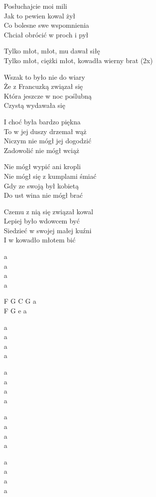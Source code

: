 \begin{text}
    Posłuchajcie moi mili\\
    Jak to pewien kowal żył\\
    Co bolesne swe wspomnienia\\
    Chciał obrócić w proch i pył

    \vin Tylko młot, młot, mu dawał siłę\\
    \vin Tylko młot, ciężki młot, kowadła wierny brat (2x)

    Wszak to było nie do wiary\\
    Że z Francuzką związał się\\
    Która jeszcze w noc poślubną\\
    Czystą wydawała się

    I choć była bardzo piękna\\
    To w jej duszy drzemał wąż\\
    Niczym nie mógł jej dogodzić\\
    Zadowolić nie mógł wciąż

    Nie mógł wypić ani kropli\\
    Nie mógł się z kumplami śmiać\\
    Gdy ze swoją był kobietą\\
    Do ust wina nie mógł brać

    Czemu z nią się związał kowal\\
    Lepiej było wdowcem być\\
    Siedzieć w swojej małej kuźni\\
    I w kowadło młotem bić

\end{text}
\begin{chord}
    a\\
    a\\
    a\\
    a

    F G C G a\\
    F G e a

    a\\
    a\\
    a\\
    a

    a\\
    a\\
    a\\
    a

    a\\
    a\\
    a\\
    a

    a\\
    a\\
    a\\
    a
\end{chord}